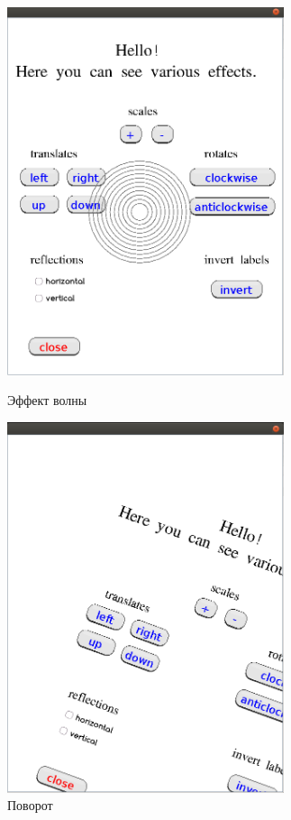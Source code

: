 \documentclass[14pt]{extarticle}
\begin{document}
	\begin{figure}[h]
		\begin{center}
		\begin{minipage}[h]{0.4\linewidth}
		\includegraphics[width=230pt]{pictures/demo21.png}
		\caption{ Эффект волны} %
		\label{wave} %
		\end{minipage}
		\hfill 
		\begin{minipage}[h]{0.4\linewidth}
		\includegraphics[width=230pt]{pictures/demo23.png}
		\caption{Поворот}
		\label{rotate}
		\end{minipage}
		\end{center}
		
			\end{figure}
		
\end{document}
